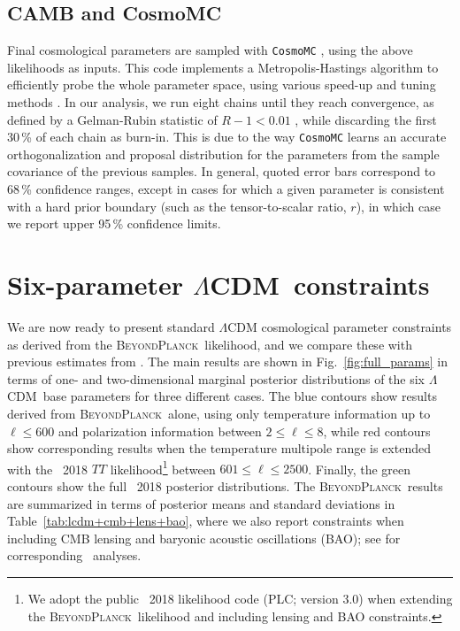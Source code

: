 \documentclass[twocolumn]{aa}
\def\LCDM{$\Lambda$CDM}
\newcommand{\BP}{\textsc{BeyondPlanck}}
\begin{document}
\subsection{CAMB and CosmoMC}
Final cosmological parameters are sampled with \texttt{CosmoMC}
\citep{cosmomc}, using the above likelihoods as inputs. This code
implements a Metropolis-Hastings algorithm to efficiently probe the
whole parameter space, using various speed-up and tuning methods
\citep{neal2005,lewis2013b}. In our analysis, we run eight chains
until they reach convergence, as defined by a Gelman-Rubin statistic
of $R-1<0.01$ \citep{gelman:1992}, while discarding the first 30\,\%
of each chain as burn-in. This is due to the way \texttt{CosmoMC}
learns an accurate orthogonalization and proposal distribution for the
parameters from the sample covariance of the previous samples. In
general, quoted error bars correspond to 68\,\% confidence ranges,
except in cases for which a given parameter is consistent with a hard
prior boundary (such as the tensor-to-scalar ratio, $r$), in which
case we report upper 95\,\% confidence limits. 

\section{Six-parameter \LCDM\ constraints}
\label{sec:LCDM_constraints}

We are now ready to present standard $\Lambda$CDM cosmological
parameter constraints as derived from the \BP\ likelihood, and we
compare these with previous estimates from 
\citep{planck2016-l05}. The main results are shown in
Fig.~\ref{fig:full_params} in terms of one- and two-dimensional
marginal posterior distributions of the six \LCDM\ base parameters for
three different cases. The blue contours show results derived from
\BP\ alone, using only temperature information up to $\ell\le600$ and
polarization information between $2\le\ell\le 8$, while red contours
show corresponding results when the temperature multipole range is
extended with the \Planck\ 2018 $TT$ likelihood\footnote{We adopt the
  public \Planck\ 2018 likelihood code (PLC; version 3.0) when
  extending the \BP\ likelihood and including lensing and BAO
  constraints.} between $601\le\ell\le2500$. Finally, the green contours
show the full \Planck\ 2018 posterior distributions. The \BP\ results
are summarized in terms of posterior means and standard deviations in
Table~\ref{tab:lcdm+cmb+lens+bao}, where we also report constraints
when including CMB lensing and baryonic
acoustic oscillations (BAO); see \citep{planck2013-p11,
  planck2014-a15} for corresponding \Planck\ analyses.
\end{document}
